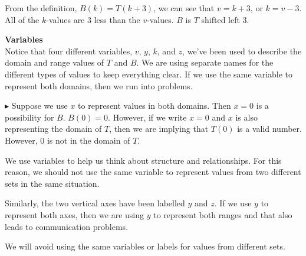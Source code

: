 \documentclass{ximera}
\begin{document}
From the definition, $B(k) = T(k+3)$, we can see that $v=k+3$, or $k=v-3$.  All of the $k$-values are $3$ less than the $v$-values.  $B$ is $T$ shifted left $3$.





\begin{warning} \textbf{\textcolor{red!80!black}{Variables}} \\

Notice that four different variables, $v$, $y$, $k$, and $z$, we've been used to describe the domain and range values of $T$ and $B$.  We are using separate names for the different types of values to keep everything clear. If we use the same variable to represent both domains, then we run into problems.


$\blacktriangleright$ Suppose we use $x$ to represent values in both domains.  Then $x = 0$ is a possibility for $B$.  $B(0) = 0$.  However, if we write $x = 0$ and $x$ is also representing the domain of $T$, then we are implying that $T(0)$ is a valid number.  However, $0$ is not in the domain of $T$.

We use variables to help us think about structure and relationships.  For this reason, we should not use the same variable to represent values from two different sets in the same situation.


Similarly, the two vertical axes have been labelled $y$ and $z$.  If we use $y$ to represent both axes, then we are using $y$ to represent both ranges and that also leads to communication problems.

We will avoid using the same variables or labels for values from different sets.

\end{warning}
\end{document}
